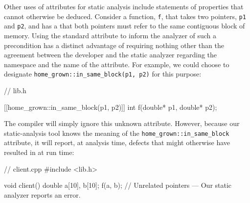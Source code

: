 Other uses of attributes for static analysis include statements of
properties that cannot otherwise be deduced. Consider a function, \lstinline!f!, that takes two pointers,
\lstinline!p1! and \lstinline!p2!, and has a  that both
pointers must refer to the same contiguous block of memory. Using the standard attribute to inform the analyzer of such a precondition has a distinct advantage of requiring nothing other than the agreement between the developer and the static analyzer regarding the namespace and the name of the attribute. For example, we could choose to designate \lstinline!home_grown::in_same_block(p1, p2)! for this purpose:

\begin{emcppslisting}[language=C++]
// lib.h

[[home_grown::in_same_block(p1, p2)]]
int f(double* p1, double* p2);
\end{emcppslisting}

\noindent The compiler will simply ignore this unknown attribute. However, because our static-analysis tool knows the meaning of the \lstinline!home_grown::in_same_block! attribute, it will report, at analysis time, defects that might otherwise have resulted in  at run time:

\begin{emcppslisting}[language=C++]
// client.cpp
#include <lib.h>

void client()
{
    double a[10], b[10];
    f(a, b);  // Unrelated pointers --- Our static analyzer reports an error.
}
\end{emcppslisting}



